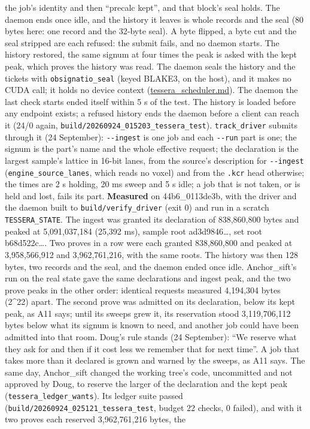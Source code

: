 \begin{description}
the job's identity and then “precalc kept”, and that block's seal holds. The daemon ends once idle, and the history it leaves is whole records and the seal (80 bytes here: one record and the 32-byte seal). A byte flipped, a byte cut and the seal stripped are each refused: the submit fails, and no daemon starts. The history restored, the same signum at four times the peak is asked with the kept peak, which proves the history was read. The daemon seals the history and the tickets with \texttt{obsignatio\_\allowbreak{}seal} (keyed BLAKE3, on the host), and it makes no CUDA call; it holds no device context (\hyperref[chap:tessera-scheduler]{tessera\_\allowbreak{}scheduler.md}). The daemon the last check starts ended itself within 5 s of the test. The history is loaded before any endpoint exists; a refused history ends the daemon before a client can reach it (24/0 again, \texttt{build/\allowbreak{}20260924\_\allowbreak{}015203\_\allowbreak{}tessera\_\allowbreak{}test}). \texttt{track\_\allowbreak{}driver} submits through it (24 September): \texttt{-\allowbreak{}-\allowbreak{}ingest} is one job and each \texttt{-\allowbreak{}-\allowbreak{}run} part is one; the signum is the part's name and the whole effective request; the declaration is the largest sample's lattice in 16-bit lanes, from the source's description for \texttt{-\allowbreak{}-\allowbreak{}ingest} (\texttt{engine\_\allowbreak{}source\_\allowbreak{}lanes}, which reads no voxel) and from the \texttt{.\allowbreak{}kcr} head otherwise; the times are 2 s holding, 20 ms sweep and 5 s idle; a job that is not taken, or is held and lost, fails its part. \textbf{Measured} on 44b6\_\allowbreak{}0113de3b, with the driver and the daemon built to \texttt{build/\allowbreak{}verify\_\allowbreak{}driver} (exit 0) and run in a scratch \texttt{TESSERA\_\allowbreak{}STATE}. The ingest was granted its declaration of 838,860,800 bytes and peaked at 5,091,037,184 (25,392 ms), sample root ad3d9846…, set root b68d522c…. Two proves in a row were each granted 838,860,800 and peaked at 3,958,566,912 and 3,962,761,216, with the same roots. The history was then 128 bytes, two records and the seal, and the daemon ended once idle. Anchor\_\allowbreak{}sift's run on the real state gave the same declarations and ingest peak, and the two prove peaks in the other order: identical requests measured 4,194,304 bytes (2\textasciicircum{}22) apart. The second prove was admitted on its declaration, below its kept peak, as A11 says; until its sweeps grew it, its reservation stood 3,119,706,112 bytes below what its signum is known to need, and another job could have been admitted into that room. Doug's rule stands (24 September): “We reserve what they ask for and then if it cost less we remember that for next time”. A job that takes more than it declared is grown and warned by the sweeps, as A11 says. The same day, Anchor\_\allowbreak{}sift changed the working tree's code, uncommitted and not approved by Doug, to reserve the larger of the declaration and the kept peak (\texttt{tessera\_\allowbreak{}ledger\_\allowbreak{}wants}). Its ledger suite passed (\texttt{build/\allowbreak{}20260924\_\allowbreak{}025121\_\allowbreak{}tessera\_\allowbreak{}test}, budget 22 checks, 0 failed), and with it two proves each reserved 3,962,761,216 bytes, the 
\end{description}
